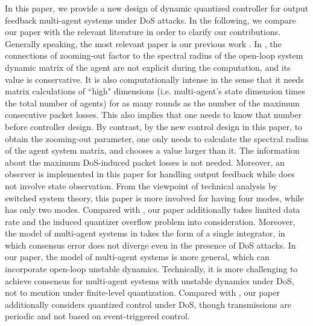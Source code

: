 \documentclass[letterpaper,journal,final,twocolumn]{IEEEtran}
\begin{document}
In this paper, we provide a new design of dynamic quantized controller for output feedback multi-agent systems under DoS attacks. 
In the following, we compare our paper with the relevant literature in order to clarify our contributions. Generally speaking, the most relevant paper is our previous work \cite{feng2020arxiv}. In \cite{feng2020arxiv}, the connections of zooming-out factor to the spectral radius of the open-loop system dynamic matrix of the agent are not explicit during the computation, and its value is conservative. It is also computationally intense in the sense that it needs matrix calculations of ``high" dimensions (i.e. multi-agent's state dimension times the total number of agents) for as many rounds as the number of the maximum consecutive packet losses. This also implies that one needs to know that number before controller design. By contrast, by the new control design in this paper, to obtain the zooming-out parameter, one only needs to calculate the spectral radius of the agent system matrix, and chooses a value larger than it. The information about the maximum DoS-induced packet losses is not needed. Moreover, an observer is implemented in this paper for handling output feedback while \cite{feng2020arxiv} does not involve state observation. 
From the viewpoint of technical analysis by switched system theory, this paper is more involved for having four modes, while \cite{feng2020arxiv} has only two modes.    
Compared with \cite{senejohnny2017jamming}, our paper additionally takes limited data rate and the induced quantizer overflow problem into consideration. Moreover, the model of multi-agent systems in \cite{senejohnny2017jamming} takes the form of a single integrator, in which consensus error does not diverge even in the presence of DoS attacks. In our paper, the model of multi-agent systems is more general, which can incorporate open-loop unstable dynamics. Technically, it is more challenging to achieve consensus for multi-agent systems with unstable dynamics under DoS, not to mention under finite-level quantization. Compared with \cite{feng2019secure}, our paper additionally considers quantized control under DoS, though transmissions are periodic and not based on event-triggered control.




 
\end{document}
